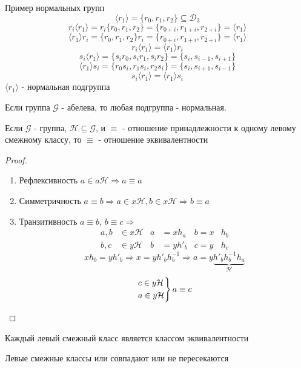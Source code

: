 \documentclass[../main/document.tex]{subfiles}
\begin{document}
\begin{exm}
Пример нормальных групп
$$\langle r_1\rangle=\{r_0,r_1,r_2\}\subseteq \mathcal{D}_3$$
$$r_i\langle r_1\rangle=r_i\{r_0,r_1,r_2\}=\{r_{0+i},r_{1+i},r_{2+i}\}=\langle r_1\rangle$$
$$\langle r_1\rangle r_i=\{r_0,r_1,r_2\}r_i=\{r_{0+i},r_{1+i},r_{2+i}\}=\langle r_1\rangle$$
$$r_i\langle r_1\rangle=\langle r_1\rangle r_i$$
$$s_i\langle r_1\rangle=\{s_ir_0,s_ir_1,s_ir_2\}=\{s_i,s_{i-1},s_{i+1}\}$$
$$\langle r_1\rangle s_i=\{r_0s_i,r_1s_i,r_2s_i\}=\{s_i,s_{i+1},s_{i-1}\}$$
$$s_i\langle r_1\rangle=\langle r_1\rangle s_i$$
$\langle r_1\rangle$ - нормальная подгруппа

\end{exm}
\begin{cnsq}
Если группа $\mathcal{G}$ - абелева, то любая подгруппа - нормальная.
\end{cnsq}
\begin{thm}
Если $\mathcal{G}$ - группа, $\mathcal{H}\subseteq \mathcal{G}$, и $\equiv$ - отношение принадлежности к одному левому смежному классу, то $\equiv$ - отношение эквивалентности
\begin{proof}
\begin{enumerate}
\item Рефлексивность $a\in a\mathcal{H}\Rightarrow a\equiv a$
\item Симметричность $a\equiv b\Rightarrow a \in x\mathcal{H}, b\in x\mathcal{H}\Rightarrow b\equiv a$
\item Транзитивность $a\equiv b$, $b\equiv c\Rightarrow $
\begin{align*}
a,b&\in x\mathcal{H} & a &=xh_a & b=x&h_b \\
b,c&\in y\mathcal{H} & b &=yh'_b & c=y&h_c 
\end{align*} 
$$xh_b=yh'_b\Rightarrow x=yh'_bh^{-1}_b\Rightarrow a=y\underbrace{h'_bh^{-1}_bh_a}_{\mathcal{H}}$$
$$
\begin{rcases}
c \in y\mathcal{H}\\
a\in y\mathcal{H}
\end{rcases}
a\equiv c
$$
\end{enumerate}
\end{proof}
\end{thm}

\begin{cnsq}
Каждый левый смежный класс является классом эквивалентности
\end{cnsq}

\begin{cnsq}
Левые смежные классы или совпадают или не пересекаются
\end{cnsq}
\end{document}
